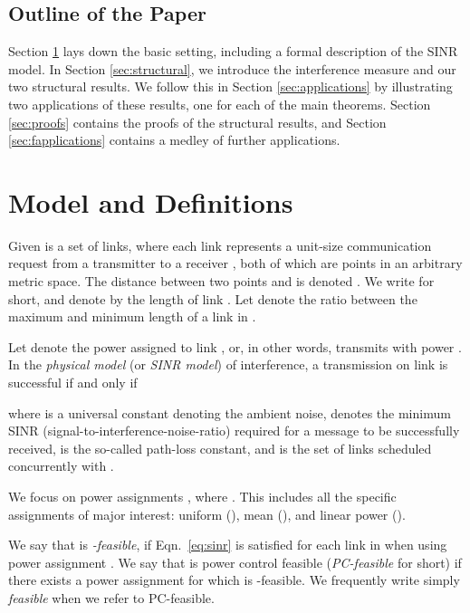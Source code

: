 \documentclass[11pt]{amsart}
\begin{document}
\subsection{Outline of the Paper}
Section \ref{sec:model} lays down the basic setting, including a
formal description of the SINR model. In Section \ref{sec:structural},
we introduce the interference measure and our two structural results. 
We follow this in Section \ref{sec:applications} by illustrating two
applications of these results, one for each of the main theorems.
Section \ref{sec:proofs} contains the proofs of the structural results, 
and Section \ref{sec:fapplications} contains a medley of further applications.



\section{Model and Definitions}
\label{sec:model}

Given is a set  of links, where
each link  represents a unit-size communication request from a transmitter
 to a receiver , both of which are points in an arbitrary metric space.
The distance between two points  and  is denoted .
We write  for short, and denote by  the length of link .
Let  denote the ratio between the maximum and
minimum length of a link in .




Let  denote the power assigned to link , or, in other words,  transmits with power . In the \emph{physical model} (or \emph{SINR model}) of interference, a
transmission on link  is successful if and only if

where  is a universal constant denoting the ambient noise,  denotes the minimum
SINR (signal-to-interference-noise-ratio) required for a message to be successfully received,
 is the so-called path-loss constant,
and  is the set of links scheduled concurrently with .


We focus on power assignments , where .  
This includes all the specific assignments of major interest:
uniform (), mean (), and linear power ().



We say that  is \emph{-feasible}, if Eqn.\ \ref{eq:sinr} is
satisfied for each link in  when using power assignment .
We say that  is power control feasible (\emph{PC-feasible} for short) if there exists a power
assignment  for which  is -feasible.
We frequently write simply \emph{feasible} when we refer to PC-feasible.
\end{document}
